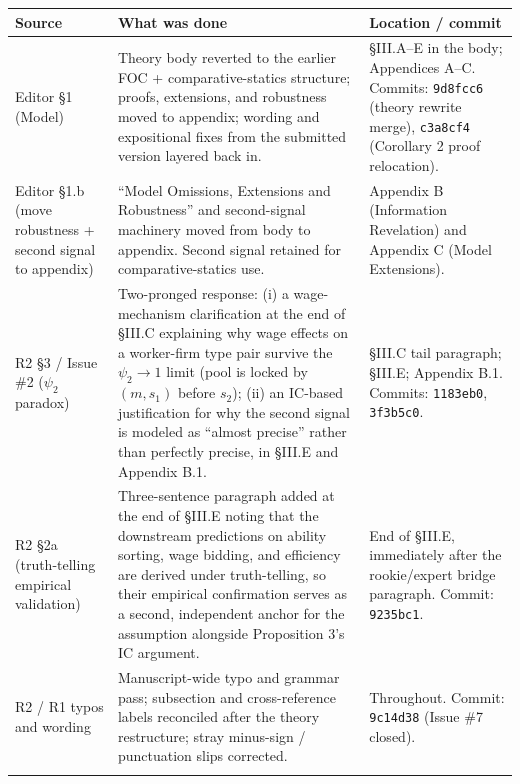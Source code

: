 \documentclass[11pt]{article}
\begin{document}
\begin{longtable}{L{3.2cm} L{7.5cm} L{4.5cm}}
\toprule
\textbf{Source} & \textbf{What was done} & \textbf{Location / commit} \\
\midrule
\endhead

Editor \S1 (Model) & Theory body reverted to the earlier FOC + comparative-statics structure; proofs, extensions, and robustness moved to appendix; wording and expositional fixes from the submitted version layered back in. & \S III.A--E in the body; Appendices A--C. Commits: \texttt{9d8fcc6} (theory rewrite merge), \texttt{c3a8cf4} (Corollary 2 proof relocation). \\
\addlinespace

Editor \S1.b (move robustness + second signal to appendix) & ``Model Omissions, Extensions and Robustness'' and second-signal machinery moved from body to appendix. Second signal retained for comparative-statics use. & Appendix B (Information Revelation) and Appendix C (Model Extensions). \\
\addlinespace

R2 \S3 / Issue \#2 ($\psi_2$ paradox) & Two-pronged response: (i) a wage-mechanism clarification at the end of \S III.C explaining why wage effects on a worker-firm type pair survive the $\psi_2 \to 1$ limit (pool is locked by $(m, s_1)$ before $s_2$); (ii) an IC-based justification for why the second signal is modeled as ``almost precise'' rather than perfectly precise, in \S III.E and Appendix B.1. & \S III.C tail paragraph; \S III.E; Appendix B.1. Commits: \texttt{1183eb0}, \texttt{3f3b5c0}. \\
\addlinespace

R2 \S2a (truth-telling empirical validation) & Three-sentence paragraph added at the end of \S III.E noting that the downstream predictions on ability sorting, wage bidding, and efficiency are derived under truth-telling, so their empirical confirmation serves as a second, independent anchor for the assumption alongside Proposition 3's IC argument. & End of \S III.E, immediately after the rookie/expert bridge paragraph. Commit: \texttt{9235bc1}. \\
\addlinespace

R2 / R1 typos and wording & Manuscript-wide typo and grammar pass; subsection and cross-reference labels reconciled after the theory restructure; stray minus-sign / punctuation slips corrected. & Throughout. Commit: \texttt{9c14d38} (Issue \#7 closed). \\
\addlinespace


\end{longtable}
\end{document}
